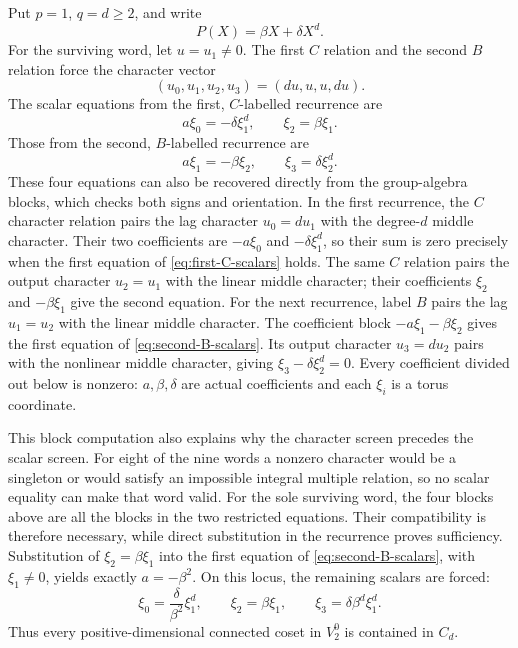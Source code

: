 \documentclass[11pt]{article}
\theoremstyle{definition}
\theoremstyle{remark}
\begin{document}
Put $p=1$, $q=d\geq2$, and write
\begin{equation}
P(X)=\beta X+\delta X^d.
\label{eq:resonant-P}
\end{equation}
For the surviving word, let $u=u_1\neq0$.  The first $C$ relation and the second $B$ relation force the character vector
\begin{equation}
(u_0,u_1,u_2,u_3)=(du,u,u,du).
\label{eq:CB-vector}
\end{equation}
The scalar equations from the first, $C$-labelled recurrence are
\begin{equation}
a\xi_0=-\delta\xi_1^d,
\qquad \xi_2=\beta\xi_1.
\label{eq:first-C-scalars}
\end{equation}
Those from the second, $B$-labelled recurrence are
\begin{equation}
a\xi_1=-\beta\xi_2,
\qquad \xi_3=\delta\xi_2^d.
\label{eq:second-B-scalars}
\end{equation}
These four equations can also be recovered directly from the group-algebra
blocks, which checks both signs and orientation.  In the first recurrence,
the $C$ character relation pairs the lag character $u_0=d u_1$ with the
degree-$d$ middle character.  Their two coefficients are
$-a\xi_0$ and $-\delta\xi_1^d$, so their sum is zero precisely when the
first equation of \eqref{eq:first-C-scalars} holds.  The same $C$ relation
pairs the output character $u_2=u_1$ with the linear middle character;
their coefficients $\xi_2$ and $-\beta\xi_1$ give the second equation.
For the next recurrence, label $B$ pairs the lag $u_1=u_2$ with the linear
middle character.  The coefficient block
$-a\xi_1-\beta\xi_2$ gives the first equation of
\eqref{eq:second-B-scalars}.  Its output character $u_3=d u_2$ pairs with
the nonlinear middle character, giving
$\xi_3-\delta\xi_2^d=0$.  Every coefficient divided out below is nonzero:
$a,\beta,\delta$ are actual coefficients and each $\xi_i$ is a torus
coordinate.

This block computation also explains why the character screen precedes the
scalar screen.  For eight of the nine words a nonzero character would be a
singleton or would satisfy an impossible integral multiple relation, so no
scalar equality can make that word valid.  For the sole surviving word,
the four blocks above are all the blocks in the two restricted equations.
Their compatibility is therefore necessary, while direct substitution in
the recurrence proves sufficiency.
Substitution of $\xi_2=\beta\xi_1$ into the first equation of \eqref{eq:second-B-scalars}, with $\xi_1\neq0$, yields exactly
$a=-\beta^2$.  On this locus, the remaining scalars are forced:
\begin{equation}
\xi_0=\frac{\delta}{\beta^2}\xi_1^d,
\qquad \xi_2=\beta\xi_1,
\qquad \xi_3=\delta\beta^d\xi_1^d.
\label{eq:forced-scalars}
\end{equation}
Thus every positive-dimensional connected coset in $V_2^0$ is contained in $C_d$.
\end{document}
